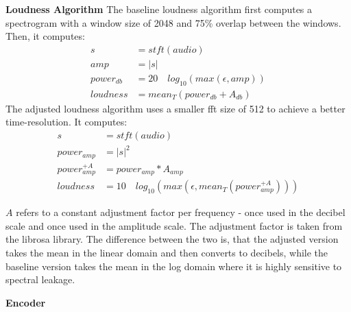 \begin{theappendices}
\textbf{Loudness Algorithm}
The baseline loudness algorithm first computes a spectrogram with a window size of 2048 and 75\% overlap between the windows. Then, it computes:
\begin{equation}
    \begin{split}
    s &= stft(audio) \\
    amp &= |s| \\
    power_{db} &= 20 \quad log_{10}(max(\epsilon, amp)) \\
    loudness &= mean_T(power_{db}+ A_{db})
    \end{split}
\end{equation}
The adjusted loudness algorithm uses a smaller fft size of 512 to achieve a better time-resolution. It computes:
\begin{equation}
    \begin{split}
    s &= stft(audio) \\
    power_{amp} &= |s|^2 \\
    power_{amp}^{+A} &= power_{amp} * A_{amp} \\
    loudness &= 10 \quad log_{10}(max(\epsilon, mean_T(power_{amp}^{+A})))
    \end{split}
\end{equation}

$A$ refers to a constant adjustment factor per frequency - once used in the decibel scale and once used in the amplitude scale. The adjustment factor is taken from the librosa library. \newline
The difference between the two is, that the adjusted version takes the mean in the linear domain and then converts to decibels, while the baseline version takes the mean in the log domain where it is highly sensitive to spectral leakage.


\textbf{Encoder}


\end{theappendices}
